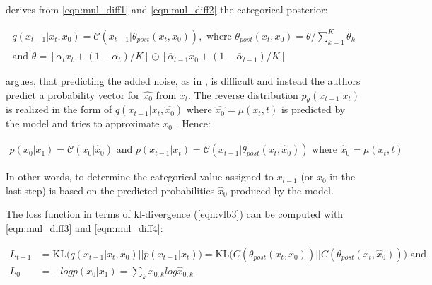 \cite{hoogeboom2021ArgmaxFlowsMultinomial} derives from \autoref{eqn:mul_diff1} and \autoref{eqn:mul_diff2} the categorical posterior:

\begin{equation}
  \begin{gathered}
  \label{eqn:mul_diff3}
  q(x_{t-1}|x_t, x_{0}) = \mathcal{C}(x_{t-1}|\theta_{post}(x_t,x_0)),\textrm{ where } \theta_{post}(x_t,x_0)=\tilde{\theta}/\sum_{k=1}^{K}\tilde{\theta}_k \\
  \textrm{and } \tilde{\theta} = \left[\alpha_tx_{t}+(1-\alpha_t)/K \right] \odot \left[\overline{\alpha}_{t-1}x_{0}+(1-\overline{\alpha}_{t-1})/K \right]
  \end{gathered}
\end{equation}

\cite{hoogeboom2021ArgmaxFlowsMultinomial} argues, that predicting the added noise, as in \cite{ho2020DenoisingDiffusionProbabilistic},
is difficult and instead the authors predict a probability vector for $\hat{x_0}$ from $x_t$.
The reverse distribution $p_\theta(x_{t-1}|x_t)$ is realized in the form of $q(x_{t-1}|x_t,\hat{x_0})$ where $\hat{x_0}=\mu(x_t, t)$ is predicted by the model and tries to approximate $x_0$ \cite{hoogeboom2021ArgmaxFlowsMultinomial}.
Hence:

\begin{equation}
  \begin{align*}
    \label{eqn:mul_diff4}
    p(x_0|x_1) = \mathcal{C}(x_0|\hat{x}_0) \textrm{ and } p(x_{t-1}|x_t) =  \mathcal{C}(x_{t-1}|\theta_{post}(x_t, \hat{x}_0)) \textrm{ where } \hat{x}_0=\mu(x_t,t)
  \end{align*}
\end{equation}

In other words, to determine the categorical value assigned to $x_{t-1}$ (or $x_0$ in the last step) is based on the predicted probabilities $\hat{x}_0$ produced by the model.


The loss function in terms of \gls{kl}-divergence (\autoref{eqn:vlb3}) can be computed with \autoref{eqn:mul_diff3} and \autoref{eqn:mul_diff4}:

\begin{equation}
  \begin{align*}
    \label{eqn:mul_diff5}
    L_{t-1}&=\text{KL}\Big(q(x_{t-1}|x_t, x_0)\big\vert\big\vert p(x_{t-1}|x_t)\Big) = \text{KL}\Big(C(\theta_{post}(x_t, x_0))\big\vert\big\vert C(\theta_{post}(x_t, \hat{x}_0))\Big) \textrm{ and}\\
    L_{0} &= -logp(x_0|x_1) = \sum_{k}^{}x_{0,k}log\hat{x}_{0,k}
  \end{align*}
\end{equation}

